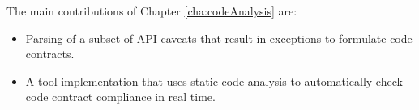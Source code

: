 \noindent
The main contributions of Chapter \ref{cha:codeAnalysis} are:
\begin{itemize}
	\item Parsing of a subset of API caveats that result in exceptions to formulate code contracts.
	\item A tool implementation that uses static code analysis to automatically check code contract compliance in real time.
\end{itemize}
